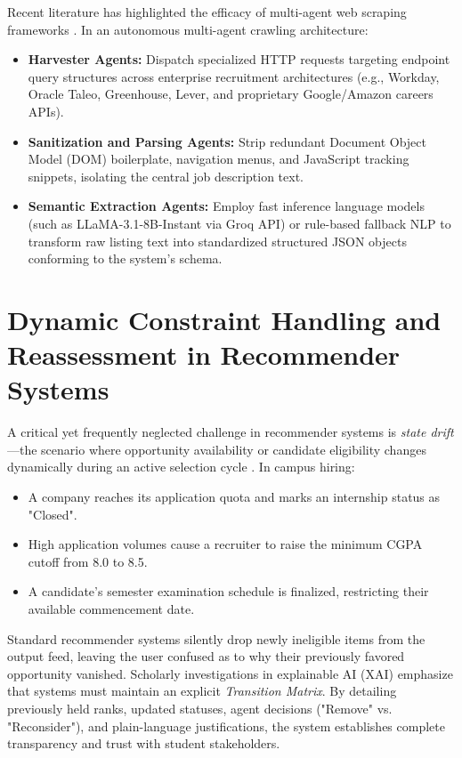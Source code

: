 Recent literature has highlighted the efficacy of multi-agent web scraping frameworks \cite{ref2,ref4}. In an autonomous multi-agent crawling architecture:
\begin{itemize}
	\item \textbf{Harvester Agents:} Dispatch specialized HTTP requests targeting endpoint query structures across enterprise recruitment architectures (e.g., Workday, Oracle Taleo, Greenhouse, Lever, and proprietary Google/Amazon careers APIs).
	\item \textbf{Sanitization and Parsing Agents:} Strip redundant Document Object Model (DOM) boilerplate, navigation menus, and JavaScript tracking snippets, isolating the central job description text.
	\item \textbf{Semantic Extraction Agents:} Employ fast inference language models (such as LLaMA-3.1-8B-Instant via Groq API) or rule-based fallback NLP to transform raw listing text into standardized structured JSON objects conforming to the system's schema.
\end{itemize}

\section{Dynamic Constraint Handling and Reassessment in Recommender Systems} \label{S2.5}
A critical yet frequently neglected challenge in recommender systems is \textit{state drift}---the scenario where opportunity availability or candidate eligibility changes dynamically during an active selection cycle \cite{ref5}. In campus hiring:
\begin{itemize}
	\item A company reaches its application quota and marks an internship status as "Closed".
	\item High application volumes cause a recruiter to raise the minimum CGPA cutoff from 8.0 to 8.5.
	\item A candidate's semester examination schedule is finalized, restricting their available commencement date.
\end{itemize}

Standard recommender systems silently drop newly ineligible items from the output feed, leaving the user confused as to why their previously favored opportunity vanished. Scholarly investigations in explainable AI (XAI) emphasize that systems must maintain an explicit \textit{Transition Matrix}. By detailing previously held ranks, updated statuses, agent decisions ("Remove" vs. "Reconsider"), and plain-language justifications, the system establishes complete transparency and trust with student stakeholders.

